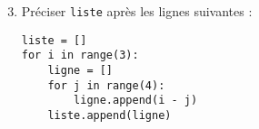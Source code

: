 \documentclass{beamer}
\begin{document}
\begin{frame}[fragile]
  \begin{enumerate}
    \setcounter{enumi}{2}
  \item Préciser \texttt{liste} après les lignes suivantes :
      \begin{verbatim}
liste = []
for i in range(3):
    ligne = []
    for j in range(4):
        ligne.append(i - j) 
    liste.append(ligne)
      \end{verbatim}
  \end{enumerate}
\end{frame}
\end{document}
